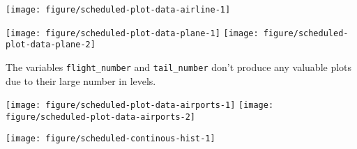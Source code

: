\documentclass{article}\usepackage[]{graphicx}\usepackage[]{color}
\newenvironment{knitrout}{}{} %
\begin{document}
\begin{knitrout}
\color{fgcolor}

{\centering \texttt{[image: figure/scheduled-plot-data-airline-1]} 

}



\end{knitrout}

\begin{knitrout}
\color{fgcolor}

{\centering \texttt{[image: figure/scheduled-plot-data-plane-1]} 
\texttt{[image: figure/scheduled-plot-data-plane-2]} 

}



\end{knitrout}

The variables \verb+flight_number+ and \verb+tail_number+ don't produce any valuable plots due to their large number in levels.

\begin{landscape}
\begin{knitrout}
\color{fgcolor}

{\centering \texttt{[image: figure/scheduled-plot-data-airports-1]} 
\texttt{[image: figure/scheduled-plot-data-airports-2]} 

}



\end{knitrout}
\vspace{3 mm}

\begin{knitrout}
\color{fgcolor}

{\centering \texttt{[image: figure/scheduled-continous-hist-1]} 

}



\end{knitrout}
\end{landscape}
\end{document}
